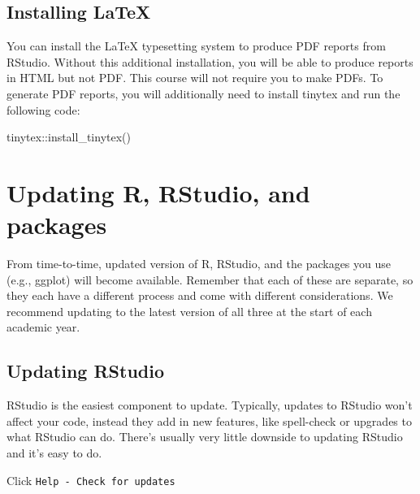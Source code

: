 \documentclass[
  oneside]{book}
\newenvironment{Shaded}{\begin{snugshade}}{\end{snugshade}}
\newcommand{\FunctionTok}[1]{\textcolor[rgb]{0.00,0.00,0.00}{#1}}
\newcommand{\NormalTok}[1]{#1}
\newcommand{\SpecialCharTok}[1]{\textcolor[rgb]{0.00,0.00,0.00}{#1}}
\begin{document}
\hypertarget{installing-latex}{%
\section{Installing LaTeX}\label{installing-latex}}

You can install the LaTeX typesetting system to produce PDF reports from RStudio. Without this additional installation, you will be able to produce reports in HTML but not PDF. This course will not require you to make PDFs. To generate PDF reports, you will additionally need to install tinytex \citep{R-tinytex} and run the following code:

\begin{Shaded}
\begin{Highlighting}[]
\NormalTok{tinytex}\SpecialCharTok{::}\FunctionTok{install\_tinytex}\NormalTok{()}
\end{Highlighting}
\end{Shaded}

\hypertarget{updating-r-rstudio-and-packages}{%
\chapter{Updating R, RStudio, and packages}\label{updating-r-rstudio-and-packages}}

From time-to-time, updated version of R, RStudio, and the packages you use (e.g., ggplot) will become available. Remember that each of these are separate, so they each have a different process and come with different considerations. We recommend updating to the latest version of all three at the start of each academic year.

\hypertarget{updating-rstudio}{%
\section{Updating RStudio}\label{updating-rstudio}}

RStudio is the easiest component to update. Typically, updates to RStudio won't affect your code, instead they add in new features, like spell-check or upgrades to what RStudio can do. There's usually very little downside to updating RStudio and it's easy to do.

Click \texttt{Help\ -\ Check\ for\ updates}
\end{document}
